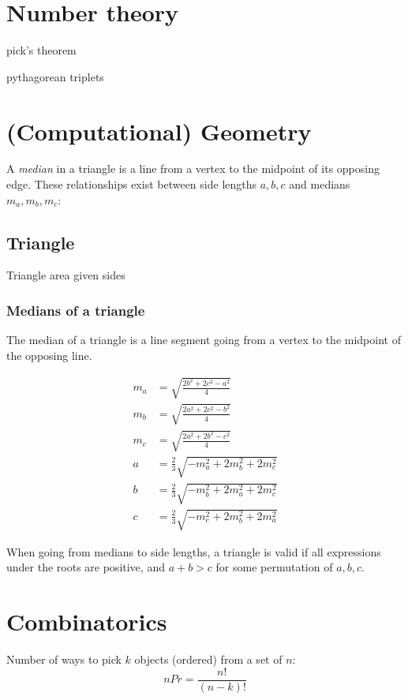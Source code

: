 \documentclass[a4paper,11pt]{article}
\begin{document}
\section{Number theory}

pick's theorem

pythagorean triplets


\section{(Computational) Geometry}

A \emph{median} in a triangle is a line from a vertex to the midpoint of its opposing edge. These relationships exist between side lengths $a,b,c$ and medians $m_a,m_b,m_c$:

\subsection{Triangle}

Triangle area given sides

\subsubsection{Medians of a triangle}

The median of a triangle is a line segment going from a vertex to the midpoint of the opposing line.

\begin{align*}
	m_a &= \sqrt{\frac{2b^2+2c^2-a^2}{4}}\\
	m_b &= \sqrt{\frac{2a^2+2c^2-b^2}{4}}\\
	m_c &= \sqrt{\frac{2a^2+2b^2-c^2}{4}}\\
	a &= \frac{2}{3}\sqrt{-m_a^2 + 2m_b^2 + 2m_c^2} \\
	b &= \frac{2}{3}\sqrt{-m_b^2 + 2m_a^2 + 2m_c^2} \\
	c &= \frac{2}{3}\sqrt{-m_c^2 + 2m_b^2 + 2m_a^2}
\end{align*}

When going from medians to side lengths, a triangle is valid if all expressions under the roots are positive, and $a+b>c$ for some permutation of $a,b,c$.

\section{Combinatorics}

Number of ways to pick $k$ objects (ordered) from a set of $n$: $$n P r = \frac{n!}{(n-k)!}$$
\end{document}
